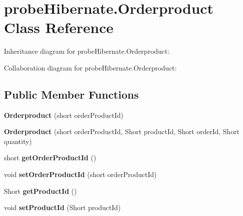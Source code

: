 \hypertarget{classprobe_hibernate_1_1_orderproduct}{}\section{probe\+Hibernate.\+Orderproduct Class Reference}
\label{classprobe_hibernate_1_1_orderproduct}


Inheritance diagram for probe\+Hibernate.\+Orderproduct\+:


Collaboration diagram for probe\+Hibernate.\+Orderproduct\+:
\subsection*{Public Member Functions}
\begin{DoxyCompactItemize}
\item 
\mbox{\label{classprobe_hibernate_1_1_orderproduct_a2d3e6cf59fa7f5476586daf4331bde92}} 
{\bfseries Orderproduct} (short order\+Product\+Id)
\item 
\mbox{\label{classprobe_hibernate_1_1_orderproduct_ac7955c3010995b02c91db17a839f2a5a}} 
{\bfseries Orderproduct} (short order\+Product\+Id, Short product\+Id, Short order\+Id, Short quantity)
\item 
\mbox{\label{classprobe_hibernate_1_1_orderproduct_aabd79df5baf1ddcb0f1a2036ccdbf0d3}} 
short {\bfseries get\+Order\+Product\+Id} ()
\item 
\mbox{\label{classprobe_hibernate_1_1_orderproduct_a5bb3da2408bc9d16bcff652c0299ae51}} 
void {\bfseries set\+Order\+Product\+Id} (short order\+Product\+Id)
\item 
\mbox{\label{classprobe_hibernate_1_1_orderproduct_a314436900a28d2a2085d04f060f6f8ad}} 
Short {\bfseries get\+Product\+Id} ()
\item 
\mbox{\label{classprobe_hibernate_1_1_orderproduct_a9214ba6223f2f5ddb659f3c1e6fe7928}} 
void {\bfseries set\+Product\+Id} (Short product\+Id)
\item 

\end{DoxyCompactItemize}
